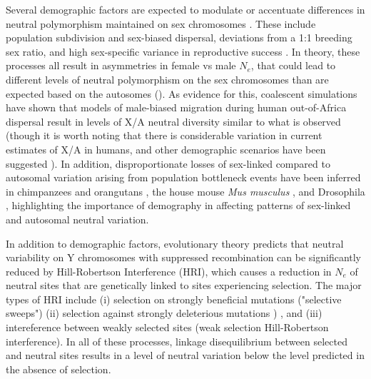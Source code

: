 \documentclass[9pt,twocolumn,twoside]{gsajnl}
\begin{document}
Several demographic factors are expected to modulate or accentuate differences in neutral polymorphism maintained on sex chromosomes \citep{ellegren2009}. These include population subdivision and sex-biased dispersal, deviations from a 1:1 breeding sex ratio, and high sex-specific variance in reproductive success \citep{caballero1995,charlesworth2001,laporte2002,pool2007}. In theory, these processes all result in asymmetries in female vs male $N_{e}$, that could lead to different levels of neutral polymorphism on the sex chromosomes than are expected based on the autosomes (\citep{pool2007}). As evidence for this, coalescent simulations have shown that models of male-biased migration during human out-of-Africa dispersal result in levels of X/A neutral diversity similar to what is observed \citep{keinan2009} (though it is worth noting that there is considerable variation in current estimates of X/A in humans, and other demographic scenarios have been suggested \citep{hammer2010,bustamante2009}). In addition, disproportionate losses of sex-linked compared to autosomal variation arising from population bottleneck events have been inferred in chimpanzees and orangutans \citep{kaessmann2001,fischer2006}, the house mouse \textit{Mus musculus} \citep{baines2007}, and Drosophila \citep{andolfatto2001}, highlighting the importance of demography in affecting patterns of sex-linked and autosomal neutral variation.


In addition to demographic factors, evolutionary theory predicts that neutral variability on Y chromosomes with suppressed recombination can be significantly reduced by Hill-Robertson Interference (HRI), which causes a reduction in $N_{e}$ of neutral sites that are genetically linked to sites experiencing selection. The major types of HRI include (i) selection on strongly beneficial mutations ("selective sweeps") \citep{smith1974hitch,aquadro1994} (ii) selection against strongly deleterious mutations
) \citep{charlesworth1996background,charlesworth1994effect} \citep{charlesworth1996CB,charlesworth2000degeneration}, and (iii) intereference between weakly selected sites (weak selection Hill-Robertson interference). In all of these processes, linkage  disequilibrium between selected and neutral sites results in a level of neutral variation below the level predicted in the absence of selection.
\end{document}
